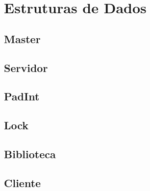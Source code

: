 \section{Estruturas de Dados}

\subsection{Master}

\subsection{Servidor}

\subsection{PadInt}

\subsection{Lock}

\subsection{Biblioteca}

\subsection{Cliente}